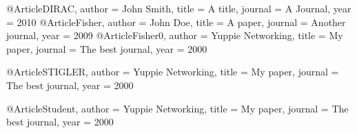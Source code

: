 @Article{DIRAC,
  author =       {John Smith},
  title =        {A title},
  journal =      {A Journal},
  year =         {2010}
}
@Article{Fisher,
  author =       {John Doe},
  title =        {A paper},
  journal =      {Another journal},
  year =         {2009}
}
@Article{Fisher0,
  author =       {Yuppie Networking},
  title =        {My paper},
  journal =      {The best journal},
  year =         {2000}
}

@Article{STIGLER,
  author =       {Yuppie Networking},
  title =        {My paper},
  journal =      {The best journal},
  year =         {2000}
}

@Article{Student,
  author =       {Yuppie Networking},
  title =        {My paper},
  journal =      {The best journal},
  year =         {2000}
}
